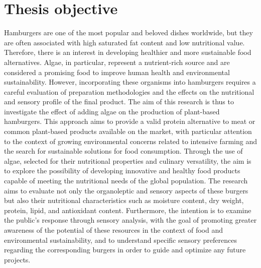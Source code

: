 
\section{Thesis objective}
Hamburgers are one of the most popular and beloved dishes worldwide, but they are often associated with high saturated fat content and low nutritional value. Therefore, there is an interest in developing healthier and more sustainable food alternatives. Algae, in particular, represent a nutrient-rich source and are considered a promising food to improve human health and environmental sustainability. However, incorporating these organisms into hamburgers requires a careful evaluation of preparation methodologies and the effects on the nutritional and sensory profile of the final product. The aim of this research is thus to investigate the effect of adding algae on the production of plant-based hamburgers. This approach aims to provide a valid protein alternative to meat or common plant-based products available on the market, with particular attention to the context of growing environmental concerns related to intensive farming and the search for sustainable solutions for food consumption. Through the use of algae, selected for their nutritional properties and culinary versatility, the aim is to explore the possibility of developing innovative and healthy food products capable of meeting the nutritional needs of the global population. The research aims to evaluate not only the organoleptic and sensory aspects of these burgers but also their nutritional characteristics such as moisture content, dry weight, protein, lipid, and antioxidant content. Furthermore, the intention is to examine the public's response through sensory analysis, with the goal of promoting greater awareness of the potential of these resources in the context of food and environmental sustainability, and to understand specific sensory preferences regarding the corresponding burgers in order to guide and optimize any future projects.

